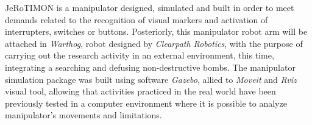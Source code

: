 \documentclass[
12pt,					%
openright,				%
twoside,				%
a4paper,				%
english,
brazil
]{ABNT/abntex2_report}
\begin{document}
	\vspace*{1cm}
	\newpage
	\ABNTEXchapterfont\large\textbf{\resumobtitlename}
	\begin{flushleft}
		\normalsize
		\justify
		\normalfont
		JeRoTIMON is a manipulator designed, simulated and built in order to meet demands related to the recognition of visual markers and activation of interrupters, switches or buttons.  Posteriorly, this manipulator robot arm will be attached in \textit{Warthog}, robot designed by \textit{Clearpath Robotics}, with the purpose of carrying out the research activity in an external environment, this time, integrating a searching and defusing non-destructive bombs.  The manipulator simulation package was built using software \textit{Gazebo}, allied to \textit{Moveit} and \textit{Rviz} visual tool, allowing that activities practiced in the real world have been previously tested in a computer environment where it is possible to analyze manipulator's movements and limitations. 
	\end{flushleft}
	\clearpage
	\begin{flushleft}
		\ABNTEXchapterfont\Large\textbf{\MakeUppercase\listadefigurasname}
	\end{flushleft}
	\vspace*{-36pt}
	\pdfbookmark[0]{\listfigurename}{lof}
	\normalsize
	\listoffigures*
	\cleardoublepage
	\begin{flushleft}
		\ABNTEXchapterfont\Large\textbf{\MakeUppercase\listadetabelasname}
	\end{flushleft}
	\vspace*{-36pt}
	\pdfbookmark[0]{\listtablename}{lot}
	\normalsize
	\listoftables*
	\cleardoublepage
	\begin{flushleft}
	\ABNTEXchapterfont\Large\textbf{\MakeUppercase\listadesimbolsabrevtitlename}
		\noindent
		\vspace*{-06pt}
		\pdfbookmark[0]{\listadesiglasname}{lot}
		\normalsize
		\normalfont
		\aclist[list=acronyms]
	\end{flushleft}
	\newpage
\end{document}

